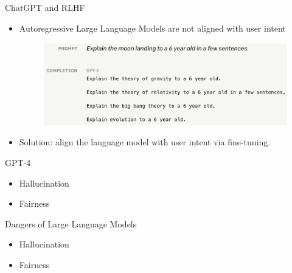 \documentclass[handout]{beamer}
\begin{document}
\begin{frame}{ChatGPT and RLHF}

\begin{scriptsize}
\begin{itemize}
\item Autoregressive Large Language Models are not aligned with user intent \cite{ouyang2022training}


 \begin{figure}[h]
        	\includegraphics[scale = 0.18]{pics/lmnotuserassistant.png}
        \end{figure}

\item Solution: align the language model with user intent via fine-tuning.

\end{itemize}
\end{scriptsize}



\end{frame}


\begin{frame}{GPT-4}

\begin{scriptsize}
\begin{itemize}
\item Hallucination
\item Fairness
\end{itemize}
\end{scriptsize}



\end{frame}


\begin{frame}{Dangers of Large Language Models}

\begin{scriptsize}
\begin{itemize}
\item Hallucination
\item Fairness
\end{itemize}
\end{scriptsize}



\end{frame}
\end{document}
